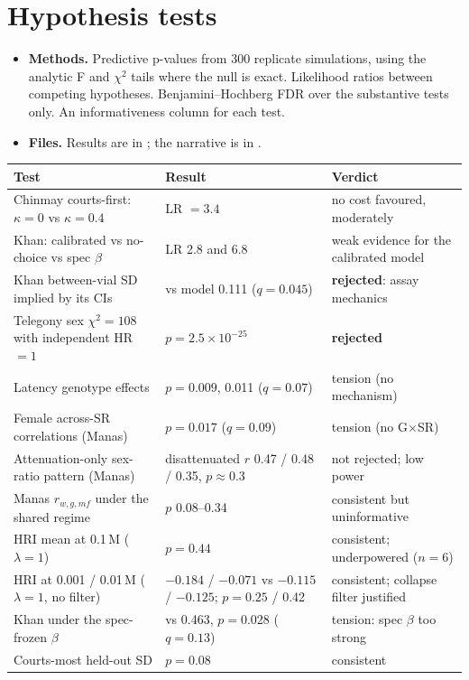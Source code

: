 \section{Hypothesis tests}
\begin{itemize}
\item \textbf{Methods.} Predictive p-values from 300 replicate simulations, using the analytic F and $\chi^2$ tails where the null is exact. Likelihood ratios between competing hypotheses. Benjamini--Hochberg FDR over the substantive tests only. An informativeness column for each test.
\item \textbf{Files.} Results are in ; the narrative is in .
\end{itemize}

\begin{tabularx}{\textwidth}{>{\raggedright\arraybackslash}p{4.6cm}>{\raggedright\arraybackslash}X>{\raggedright\arraybackslash}p{3.6cm}}\toprule
Test & Result & Verdict\\\midrule
Chinmay courts-first: $\kappa=0$ vs $\kappa=0.4$ & LR $=3.4$ & no cost favoured, moderately\\
Khan: calibrated vs no-choice vs spec $\beta$ & LR 2.8 and 6.8 & weak evidence for the calibrated model\\
Khan between-vial SD implied by its CIs & 0.029 vs model 0.111 ($q=0.045$) & \textbf{rejected}: assay mechanics\\
Telegony sex $\chi^2=108$ with independent HR $=1$ & $p=2.5\times10^{-25}$ & \textbf{rejected}\\
Latency genotype effects & $p=0.009$, 0.011 ($q=0.07$) & tension (no mechanism)\\
Female across-SR correlations (Manas) & $p=0.017$ ($q=0.09$) & tension (no G$\times$SR)\\
Attenuation-only sex-ratio pattern (Manas) & disattenuated $r$ 0.47 / 0.48 / 0.35, $p\approx0.3$ & not rejected; low power\\
Manas $r_{w,g,mf}$ under the shared regime & $p$ 0.08--0.34 & consistent but uninformative\\
HRI mean at 0.1\,M ($\lambda=1$) & $p=0.44$ & consistent; underpowered ($n=6$)\\
HRI at 0.001 / 0.01\,M ($\lambda=1$, no filter) & $-0.184$ / $-0.071$ vs $-0.115$ / $-0.125$; $p=0.25$ / 0.42 & consistent; collapse filter justified\\
Khan under the spec-frozen $\beta$ & 0.413 vs 0.463, $p=0.028$ ($q=0.13$) & tension: spec $\beta$ too strong\\
Courts-most held-out SD & $p=0.08$ & consistent\\\bottomrule
\end{tabularx}

